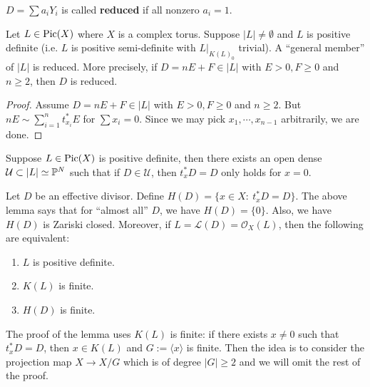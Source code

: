 \begin{definition}
$D=\sum a_i Y_i$ is called \textbf{reduced} if all nonzero $a_i=1$.
\end{definition}

\begin{lemma}
Let $L\in \operatorname{Pic}(X)$ where $X$ is a complex torus. Suppose $|L|\not=\emptyset$ and $L$ is positive definite (i.e. $L$ is positive semi-definite with $L|_{K(L)_0}$ trivial). A ``general member'' of $|L|$ is reduced. More precisely, if $D=nE+F\in |L|$ with $E>0,F\geq 0$ and $n\geq 2$, then $D$ is reduced.
\end{lemma}

\begin{proof}
Assume $D=nE+F\in |L|$ with $E>0, F\geq 0$ and $n\geq 2$. But $nE\sim \sum_{i=1}^n t_{x_i}^* E$ for $\sum x_i=0$. Since we may pick $x_1,\cdots, x_{n-1}$ arbitrarily, we are done.
\end{proof}

\begin{lemma}
Suppose $L\in\operatorname{Pic}(X)$ is positive definite, then there exists an open dense $\mathcal{U}\subset |L|\simeq {\mathbb P}^N$ such that if $D\in \mathcal{U}$, then $t_x^* D=D$ only holds for $x=0$.  
\end{lemma}

\begin{remark}
Let $D$ be an effective divisor. Define $H(D)=\{x\in X:\ t_x^*D=D\}$. The above lemma says that for ``almost all'' $D$, we have $H(D)=\{0\}$. Also, we have $H(D)$ is Zariski closed. Moreover, if $L=\mathcal{L}(D)=\mathcal{O}_X(L)$, then the following are equivalent:
\begin{enumerate}
\item $L$ is positive definite.
\item $K(L)$ is finite.
\item $H(D)$ is finite.
\end{enumerate}
\end{remark}

The proof of the lemma uses $K(L)$ is finite: if there exists $x\not=0$ such that $t_x^* D = D$, then $x\in K(L)$ and $G:=\langle x\rangle$ is finite. Then the idea is to consider the projection map $X\to X/G$ which is of degree $|G|\geq 2$ and we will omit the rest of the proof.

